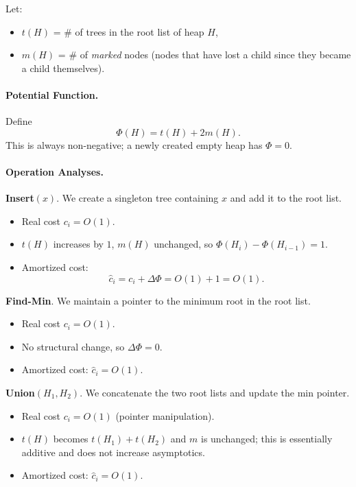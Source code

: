 \documentclass[9pt]{extarticle}
\begin{document}
Let:
\begin{itemize}
  \item $t(H)$ = \# of trees in the root list of heap $H$,
  \item $m(H)$ = \# of \emph{marked} nodes (nodes that have lost a child since they became a child themselves).
\end{itemize}

\paragraph{Potential Function.}
Define
\[
  \Phi(H) = t(H) + 2 m(H).
\]
This is always non-negative; a newly created empty heap has $\Phi = 0$.

\paragraph{Operation Analyses.}

\textbf{Insert$(x)$}.  
We create a singleton tree containing $x$ and add it to the root list.

\begin{itemize}
  \item Real cost $c_i = O(1)$.
  \item $t(H)$ increases by $1$, $m(H)$ unchanged, so $\Phi(H_i)-\Phi(H_{i-1}) = 1$.
  \item Amortized cost:
    \[
      \hat c_i = c_i + \Delta \Phi = O(1) + 1 = O(1).
    \]
\end{itemize}

\textbf{Find-Min}.  
We maintain a pointer to the minimum root in the root list.

\begin{itemize}
  \item Real cost $c_i = O(1)$.
  \item No structural change, so $\Delta \Phi = 0$.
  \item Amortized cost: $\hat c_i = O(1)$.
\end{itemize}

\textbf{Union$(H_1,H_2)$}.  
We concatenate the two root lists and update the min pointer.

\begin{itemize}
  \item Real cost $c_i = O(1)$ (pointer manipulation).
  \item $t(H)$ becomes $t(H_1)+t(H_2)$ and $m$ is unchanged; this is essentially additive and does not increase asymptotics.
  \item Amortized cost: $\hat c_i = O(1)$.
\end{itemize}
\end{document}

